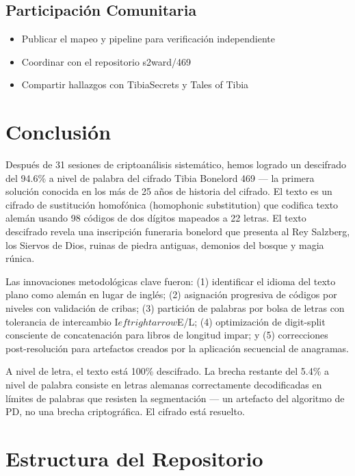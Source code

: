 \documentclass[11pt,a4paper]{article}
\begin{document}
\subsection{Participaci\'{o}n Comunitaria}

\begin{itemize}
\item Publicar el mapeo y pipeline para verificaci\'{o}n independiente
\item Coordinar con el repositorio s2ward/469
\item Compartir hallazgos con TibiaSecrets y Tales of Tibia
\end{itemize}

\section{Conclusi\'{o}n}

Despu\'{e}s de 31 sesiones de criptoan\'{a}lisis sistem\'{a}tico, hemos logrado un descifrado del 94.6\% a nivel de palabra del cifrado Tibia Bonelord 469 --- la primera soluci\'{o}n conocida en los m\'{a}s de 25 a\~{n}os de historia del cifrado. El texto es un cifrado de sustituci\'{o}n homof\'{o}nica (homophonic substitution) que codifica texto alem\'{a}n usando 98 c\'{o}digos de dos d\'{i}gitos mapeados a 22 letras. El texto descifrado revela una inscripci\'{o}n funeraria bonelord que presenta al Rey Salzberg, los Siervos de Dios, ruinas de piedra antiguas, demonios del bosque y magia r\'{u}nica.

Las innovaciones metodol\'{o}gicas clave fueron: (1) identificar el idioma del texto plano como alem\'{a}n en lugar de ingl\'{e}s; (2) asignaci\'{o}n progresiva de c\'{o}digos por niveles con validaci\'{o}n de cribas; (3) partici\'{o}n de palabras por bolsa de letras con tolerancia de intercambio I$eftrightarrow$E/L; (4) optimizaci\'{o}n de digit-split consciente de concatenaci\'{o}n para libros de longitud impar; y (5) correcciones post-resoluci\'{o}n para artefactos creados por la aplicaci\'{o}n secuencial de anagramas.

A nivel de letra, el texto est\'{a} 100\% descifrado. La brecha restante del 5.4\% a nivel de palabra consiste en letras alemanas correctamente decodificadas en l\'{i}mites de palabras que resisten la segmentaci\'{o}n --- un artefacto del algoritmo de PD, no una brecha criptogr\'{a}fica. El cifrado est\'{a} resuelto.

\appendix

\section{Estructura del Repositorio}
\end{document}
